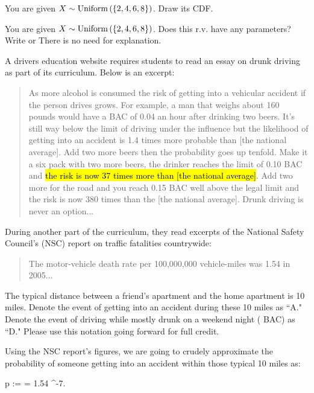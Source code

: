 \documentclass[12pt]{article}
\begin{document}
 You are given $X \sim \mathrm{Uniform}\left(\left\{2,4,6,8\right\}\right)$. Draw its CDF.

 You are given $X \sim \mathrm{Uniform}\left(\left\{2,4,6,8\right\}\right)$. Does this r.v. have any parameters? Write  or  There is no need for explanation.
\eenum
\pagebreak

\problem A drivers education website requires students to read an essay on drunk driving as part of its curriculum. Below is an excerpt:

\begin{quotation} \sf
\noindent As more alcohol is consumed the risk of getting into a vehicular accident if the person drives grows. For example, a man that weighs about 160 pounds would have a BAC of 0.04 an hour after drinking two beers. It's still way below the limit of driving under the influence but the likelihood of getting into an accident is 1.4 times more probable than [the national average]. Add two more beers then the probability goes up tenfold. Make it a six pack with two more beers, the drinker reaches the limit of 0.10 BAC and \color{white} \hl{the risk is now 37 times more than [the national average]}. \color{black} Add two more for the road and you reach 0.15 BAC well above the legal limit and the risk is now 380 times than the [the national average]. Drunk driving is never an option...
\end{quotation}

During another part of the curriculum, they read excerpts of the National Safety Council's (NSC) report on traffic fatalities countrywide:

\begin{quotation} \sf
\noindent The motor-vehicle death rate per 100,000,000 vehicle-miles was 1.54 in 2005...
\end{quotation}

The typical distance between a friend's apartment and the home apartment is 10 miles. Denote the event of getting into an accident during these 10 miles as ``A." Denote the event of driving while mostly drunk on a weekend night ( BAC) as ``D." Please use this notation going forward for full credit.

Using the NSC report's figures, we are going to crudely approximate the probability of someone getting into an accident within those typical 10 miles as:

\beqn
p :=  \approx {}  = 1.54 ^{-7}.
\eeqn
\end{document}
